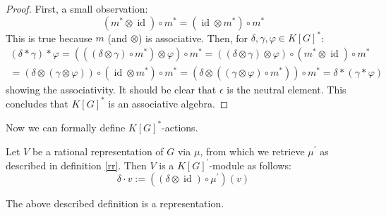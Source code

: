 \begin{proof}
  First, a small observation:
  \begin{equation}
    \left(m^\ast \otimes \operatorname{id} \right) \circ m^\ast = \left( \operatorname{id} \otimes m^\ast \right) \circ m^\ast
  \end{equation}
  This is true because $m$ (and $ \otimes $) is associative.
  Then, for $\delta, \gamma, \varphi \in K \left\lbrack G \right\rbrack^\ast$:
  \begin{equation}
    \begin{aligned}
      \left( \delta \ast \gamma \right) \ast \varphi
      = \left( \left( \left( \delta \otimes \gamma \right) \circ m^\ast \right) \otimes \varphi \right) \circ m^\ast
      = \left( (\delta \otimes \gamma) \otimes \varphi \right) \circ \left( m^\ast \otimes \operatorname{id} \right) \circ m^\ast \\
      = \left( \delta \otimes (\gamma \otimes \varphi) \right) \circ \left( \operatorname{id} \otimes m^\ast \right) \circ m^\ast
      = \left( \delta \otimes \left( \left( \gamma \otimes \varphi \right) \circ m^\ast \right) \right) \circ m^\ast
      = \delta \ast \left( \gamma \ast \varphi \right)
    \end{aligned}
  \end{equation}
  showing the associativity.
  It should be clear that $\epsilon$ is the neutral element.
  This concludes that $K \left\lbrack G \right\rbrack^\ast$ is an associative algebra.
\end{proof}

Now we can formally define $K [G]^\ast$-actions.

\begin{definition}\label{da}
  Let $V$ be a rational representation of $G$ via $\mu$, from which we retrieve $\mu^\prime$ as described in definition \ref{rr}.
  Then $V$ is a $K[G]^\prime$-module as follows:
  \begin{equation}
    \delta \cdot v := \left(\left( \delta \otimes \operatorname{id} \right) \circ \mu^\prime \right) \left(v\right)
  \end{equation}
\end{definition}

\begin{proposition}
  The above described definition is a representation.
\end{proposition}

